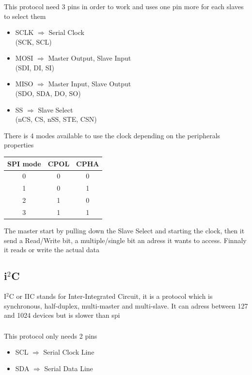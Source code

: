 \documentclass[12pt,a4paper,landscape]{article}
\begin{document}
\begin{multicols}{2}
		\subsubsection*{}
		This protocol need 3 pins in order to work and uses one pin more for each slaves to select them 
		\begin{itemize}
			\item SCLK $\Rightarrow$ Serial Clock\\
				  (SCK, SCL)
			\item MOSI $\Rightarrow$ Master Output, Slave Input\\
				  (SDI, DI, SI)
			\item MISO $\Rightarrow$ Master Input, Slave Output\\
				  (SDO, SDA, DO, SO)
			\item SS $\Rightarrow$ Slave Select\\
				  (nCS, CS, nSS, STE, CSN)
		\end{itemize}
		There is 4 modes available to use the clock depending on the peripherals properties\\
			\begin{center}
				\begin{tabular}{|c|c|c|}\hline
					SPI mode & CPOL & CPHA \\\hline\hline
					0        & 0    & 0    \\\hline
					1        & 0    & 1    \\\hline
					2        & 1    & 0    \\\hline
					3        & 1    & 1    \\\hline
				\end{tabular}
			\end{center}

		The master start by pulling down the Slave Select and starting the clock, then it send a Read/Write bit, a multiple/single bit an adress it wants to access. Finnaly it reads or write the actual data


		\subsection*{\texorpdfstring{i$^{2}$C}{}}
		I$^2$C or IIC stands for Inter-Integrated Circuit, it is a protocol which is synchronous, half-duplex, multi-master and multi-slave. It can adress between 127 and 1024 devices but is slower than spi
		\subsubsection*{}
		This protocol only needs 2 pins
		\begin{itemize}
			\item SCL $\Rightarrow$ Serial Clock Line\\
			\item SDA $\Rightarrow$ Serial Data Line
		\end{itemize}

\end{multicols}
\end{document}

